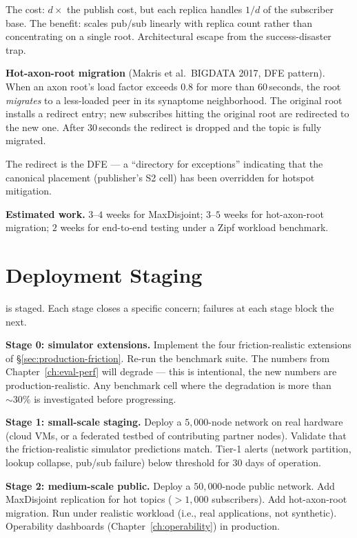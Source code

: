 \documentclass[twoside,nobib]{tufte-book}
\begin{document}
The cost: $d \times$ the publish cost, but each replica handles
$1/d$ of the subscriber base. The benefit: scales pub/sub
linearly with replica count rather than concentrating on a
single root. Architectural escape from the success-disaster
trap.

\textbf{Hot-axon-root migration} (Makris et al.\ BIGDATA 2017,
DFE pattern). When an axon root's load factor exceeds $0.8$
for more than $60$\,seconds, the root \emph{migrates} to a
less-loaded peer in its synaptome neighborhood. The original
root installs a redirect entry; new subscribes hitting the
original root are redirected to the new one. After
$30$\,seconds the redirect is dropped and the topic is fully
migrated.

The redirect is the DFE --- a ``directory for exceptions''
indicating that the canonical placement (publisher's S2 cell)
has been overridden for hotspot mitigation.

\textbf{Estimated work.} $3$--$4$ weeks for MaxDisjoint;
$3$--$5$ weeks for hot-axon-root migration; $2$ weeks for
end-to-end testing under a Zipf workload benchmark.

\label{sec:production-zipf}

\section{Deployment Staging}

 is staged. Each stage closes a
specific concern; failures at each stage block the next.

\textbf{Stage 0: simulator extensions.} Implement the four
friction-realistic extensions of \S\ref{sec:production-friction}.
Re-run the benchmark suite. The numbers from
Chapter~\ref{ch:eval-perf} will degrade --- this is intentional,
the new numbers are production-realistic. Any benchmark cell
where the degradation is more than $\sim 30\%$ is investigated
before progressing.

\textbf{Stage 1: small-scale staging.} Deploy a $5{,}000$-node
network on real hardware (cloud VMs, or a federated testbed of
contributing partner nodes). Validate that the friction-realistic
simulator predictions match. Tier-1 alerts (network partition,
lookup collapse, pub/sub failure) below threshold for $30$ days
of operation.

\textbf{Stage 2: medium-scale public.} Deploy a $50{,}000$-node
public network. Add MaxDisjoint replication for hot topics
($> 1{,}000$ subscribers). Add hot-axon-root migration. Run
under realistic workload (i.e., real applications, not
synthetic). Operability dashboards (Chapter~\ref{ch:operability})
in production.
\end{document}
